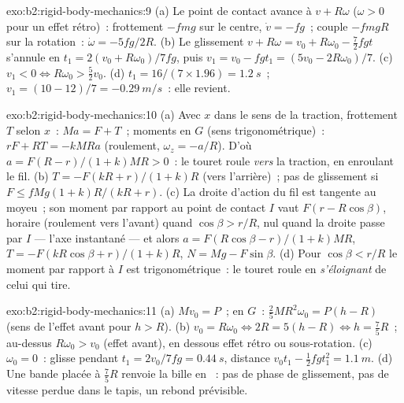 \begin{solution}{exo:b2:rigid-body-mechanics:9}
(a) Le point de contact avance à $v + R\omega$ ($\omega > 0$ pour un
effet rétro)~: frottement $-fmg$ sur le centre, $\dot v = -fg$~; couple
$-fmgR$ sur la rotation~: $\dot\omega = -5fg/2R$. (b) Le glissement $v + R\omega = v_0 +
R\omega_0 - \tfrac72fgt$ s'annule en $t_1 = 2(v_0 + R\omega_0)/7fg$, puis $v_1
= v_0 - fgt_1 = (5v_0 - 2R\omega_0)/7$. (c) $v_1 < 0 \iff R\omega_0 > \tfrac52v_0$.
(d) $t_1 = 16/(7 \times 1.96) = \qty{1.2}{s}$~; $v_1 = (10 - 12)/7 = \qty{-0.29}{m/s}$~:
elle revient.
\end{solution}

\begin{solution}{exo:b2:rigid-body-mechanics:10}
(a) Avec $x$ dans le sens de la traction, frottement $T$ selon $x$~: $Ma = F + T$~;
moments en $G$ (sens trigonométrique)~: $rF + RT = -kMRa$ (roulement, $\omega_z
= -a/R$). D'où $a = F(R - r)/(1 + k)MR > 0$~: le touret roule
\emph{vers} la traction, en enroulant le fil. (b) $T = -F(kR + r)/(1 +
k)R$ (vers l'arrière)~; pas de glissement si $F \le fMg(1 + k)R/(kR + r)$. (c) La droite
d'action du fil est tangente au moyeu~; son moment par rapport au point de
contact $I$ vaut $F(r - R\cos\beta)$, horaire (roulement vers l'avant) quand $\cos\beta >
r/R$, nul quand la droite passe par $I$ --- l'axe instantané
--- et alors $a = F(R\cos\beta - r)/(1 + k)MR$, $T = -F(kR\cos\beta + r)/(1 + k)R$,
$N = Mg - F\sin\beta$. (d) Pour $\cos\beta < r/R$ le moment par rapport à $I$ est
trigonométrique~: le touret roule en \emph{s'éloignant} de celui qui tire.
\end{solution}

\begin{solution}{exo:b2:rigid-body-mechanics:11}
(a) $Mv_0 = P$~; en $G$~: $\tfrac25MR^2\omega_0 = P(h - R)$ (sens de l'effet avant
pour $h > R$). (b) $v_0 = R\omega_0 \iff 2R = 5(h - R) \iff h = \tfrac75R$~; au-dessus
$R\omega_0 > v_0$ (effet avant), en dessous effet rétro ou sous-rotation. (c)
$\omega_0 = 0$~: glisse pendant $t_1 = 2v_0/7fg = \qty{0.44}{s}$, distance $v_0t_1 -
\tfrac12fgt_1^2 = \qty{1.1}{m}$. (d) Une bande placée à $\tfrac75R$ renvoie la bille
en ~: pas de phase de glissement, pas de vitesse perdue dans le tapis,
un rebond prévisible.
\end{solution}


